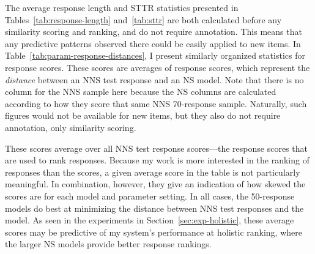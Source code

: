 The average response length and STTR statistics presented in Tables~\ref{tab:response-length} and~\ref{tab:sttr} are both calculated before any similarity scoring and ranking, and do not require annotation. This means that any predictive patterns observed there could be easily applied to new items. In Table~\ref{tab:param-response-distances}, I present similarly organized statistics for response scores. These scores are averages of response scores, which represent the \textit{distance} between an NNS test response and an NS model. Note that there is no column for the NNS sample here because the NS columns are calculated according to how they score that same NNS 70-response sample. Naturally, such figures would not be available for new items, but they also do not require annotation, only similarity scoring.

These scores average over all NNS test response scores---the response scores that are used to rank responses. Because my work is more interested in the ranking of responses than the scores, a given average score in the table is not particularly meaningful. In combination, however, they give an indication of how skewed the scores are for each model and parameter setting. In all cases, the 50-response  models do best at minimizing the distance between NNS test responses and the model. As seen in the experiments in Section~\ref{sec:exp-holistic}, these average scores may be predictive of my system's performance at holistic ranking, where the larger NS models provide better response rankings.


